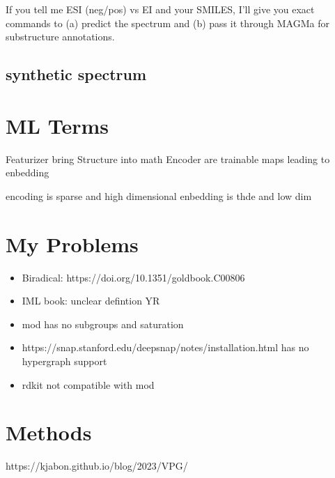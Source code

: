 If you tell me ESI (neg/pos) vs EI and your SMILES, I’ll give you exact commands to (a) predict the spectrum and (b) pass it through MAGMa for substructure annotations.


\subsection{synthetic spectrum}

\section{ML Terms}
Featurizer bring Structure into math
Encoder are trainable maps leading to enbedding

encoding is sparse and high dimensional 
enbedding is thde and low dim


\section{My Problems}

\begin{itemize}
    \item Biradical: https://doi.org/10.1351/goldbook.C00806
    \item IML book: unclear defintion YR
    \item mod has no subgroups and saturation
    \item https://snap.stanford.edu/deepsnap/notes/installation.html has no hypergraph support
    \item rdkit not compatible with mod
\end{itemize}

\section{Methods}

https://kjabon.github.io/blog/2023/VPG/